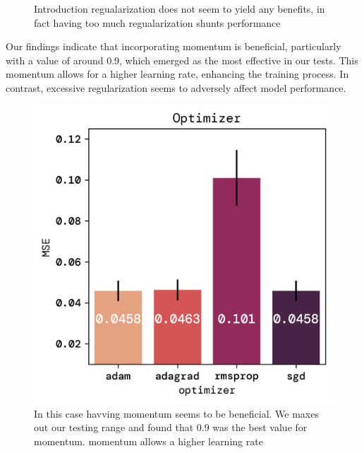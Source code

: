 \documentclass[twoside,11pt]{report}
\begin{document}
\begin{figure}[!ht]
\begin{minipage}[t]{0.5\textwidth - 1mm}
\begin{center}
            \end{center}
            \caption{Introduction regualarization does not seem to yield any benefits, in fact
            having too much regualarization shunts performance}\label{fig:MSE_aplha}
        \end{minipage}
    \end{figure}

    \noindent
    Our findings indicate that incorporating momentum is beneficial, particularly with a value of 
    around 0.9, which emerged as the most effective in our tests. This momentum allows for a higher learning rate, 
    enhancing the training process. In contrast, excessive regularization seems to adversely affect model performance.
    
    \begin{figure}[!ht]
        \begin{minipage}[t]{0.5\textwidth - 1mm}
            \begin{center}
                \includegraphics[width=\textwidth]{../runsAndFigures/MSE_optimizer.png}
            \end{center}
            \caption{In this case havving momentum seems to be beneficial. 
            We maxes out our testing range and found that 0.9 was the best value for momentum. 
            momentum allows a higher learning rate}\label{fig:MSE_optimizer}

\end{minipage}
\end{figure}
\end{document}
